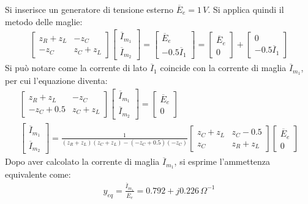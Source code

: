 \documentclass{article}
\begin{document}
Si inserisce un generatore di tensione esterno $\overline{E}_e=1\,V$. 
Si applica quindi il metodo delle maglie:
\begin{gather*}
    \begin{bmatrix}
        z_R+z_L&-z_C\\-z_C&z_C+z_L
    \end{bmatrix}\begin{bmatrix}
        \overline{I}_{m_1}\\\overline{I}_{m_2}
    \end{bmatrix}=\begin{bmatrix}
        \overline{E}_e\\-0.5\overline{I}_1
    \end{bmatrix}=\begin{bmatrix}
        \overline{E}_e\\0
    \end{bmatrix}+\begin{bmatrix}
        0\\-0.5\overline{I}_1
    \end{bmatrix}
\end{gather*}
Si può notare come la corrente di lato $\overline{I}_1$ coincide con la corrente di maglia $\overline{I}_{m_1}$, per cui l'equazione diventa:
\begin{gather*}
    \begin{bmatrix}
        z_R+z_L&-z_C\\-z_C+0.5&z_C+z_L
    \end{bmatrix}\begin{bmatrix}
        \overline{I}_{m_1}\\\overline{I}_{m_2}
    \end{bmatrix}=\begin{bmatrix}
        \overline{E}_e\\0
    \end{bmatrix}\\
    \begin{bmatrix}
        \overline{I}_{m_1}\\\overline{I}_{m_2}
    \end{bmatrix}=\displaystyle\frac{1}{(z_R+z_L)(z_C+z_L)-(-z_C+0.5)(-z_C)}\begin{bmatrix}
        z_C+z_L&z_C-0.5\\z_C&z_R+z_L
    \end{bmatrix}\begin{bmatrix}
        \overline{E}_e\\0
    \end{bmatrix}
\end{gather*}
Dopo aver calcolato la corrente di maglia $\overline{I}_{m_1}$, si esprime l'ammettenza equivalente come:
\begin{gather}
    y_{eq}=\displaystyle\frac{\overline{I}_{m_1}}{\overline{E}_e}=0.792+j0.226\,\Omega^{-1}
\end{gather}
\end{document}
